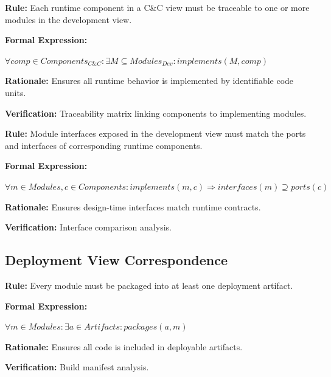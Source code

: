 \documentclass[11pt,letterpaper]{article}
\begin{document}
\begin{definitionbox}
\textbf{Rule:} Each runtime component in a C\&C view must be traceable to one or more modules in the development view.

\textbf{Formal Expression:}
\begin{center}
$\forall comp \in Components_{C\&C} : \exists M \subseteq Modules_{Dev} : implements(M, comp)$
\end{center}

\textbf{Rationale:} Ensures all runtime behavior is implemented by identifiable code units.

\textbf{Verification:} Traceability matrix linking components to implementing modules.
\end{definitionbox}

\begin{definitionbox}
\textbf{Rule:} Module interfaces exposed in the development view must match the ports and interfaces of corresponding runtime components.

\textbf{Formal Expression:}
\begin{center}
$\forall m \in Modules, c \in Components : implements(m, c) \Rightarrow interfaces(m) \supseteq ports(c)$
\end{center}

\textbf{Rationale:} Ensures design-time interfaces match runtime contracts.

\textbf{Verification:} Interface comparison analysis.
\end{definitionbox}

\subsection{Deployment View Correspondence}

\begin{definitionbox}
\textbf{Rule:} Every module must be packaged into at least one deployment artifact.

\textbf{Formal Expression:}
\begin{center}
$\forall m \in Modules : \exists a \in Artifacts : packages(a, m)$
\end{center}

\textbf{Rationale:} Ensures all code is included in deployable artifacts.

\textbf{Verification:} Build manifest analysis.
\end{definitionbox}
\end{document}
